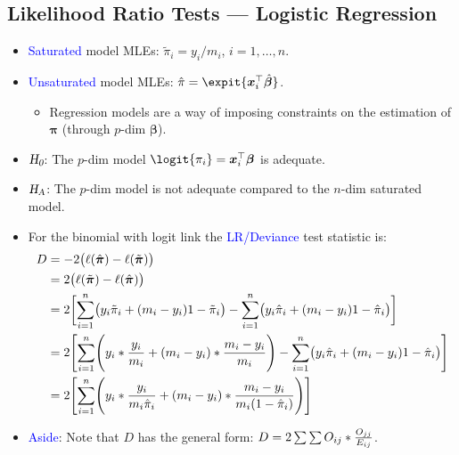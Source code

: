 \documentclass[oneside]{book}\usepackage[]{graphicx}\usepackage[svgnames]{xcolor}
\let\log\relax%
\newcommand{\HN}{\textsl{H}_{\textsl{0}}}%
\newcommand{\HA}{\textsl{H}_{\textsl{A}}}%
\providecommand{\Vector}[1]{\bm{#1}}%
\begin{document}
\subsection*{Likelihood Ratio Tests --- Logistic Regression}
\begin{itemize}
      \item \textcolor{Blue}{Saturated} model MLEs: $ \tilde{\pi}_i=y_i/m_i $, $ i=1,\ldots,n $.
      \item \textcolor{Blue}{Unsaturated} model MLEs: $ \hat{\pi}=\expit{\Vector{x}_i^\top \hat{\Vector{\beta}}} $.
            \begin{itemize}
                  \item Regression models are a way of imposing constraints on the estimation of $ \Vector{\pi} $ (through $ p $-dim $ \Vector{\beta} $).
            \end{itemize}
      \item $ \HN $: The $ p $-dim model $ \logit{\pi_i}=\Vector{x}_i^\top \Vector{\beta} $ is adequate.
      \item $ \HA $: The $ p $-dim model is not adequate compared to the $n$-dim saturated model.
      \item For the binomial with logit link the \textcolor{Blue}{LR/Deviance} test statistic is:
            \begin{align*}
                  D
                   & =-2\bigl(\ell(\hat{\Vector{\pi}})-\ell(\tilde{\Vector{\pi}})\bigr)                                                                                                                      \\
                   & =2\bigl(\ell(\tilde{\Vector{\pi}})-\ell(\hat{\Vector{\pi}})\bigr)                                                                                                                       \\
                   & =2\biggl[\sum_{i=1}^{n} \bigl(y_i\log{\tilde{\pi}_i}+(m_i-y_i)\log{1-\tilde{\pi}_i}\bigr)-\sum_{i=1}^{n} \bigl(y_i\log{\hat{\pi}_i}+(m_i-y_i)\log{1-\hat{\pi}_i}\bigr) \biggr]          \\
                   & =2\Biggl[\sum_{i=1}^{n} \Biggl(y_i\log*{\frac{y_i}{m_i}}+(m_i-y_i)\log*{\frac{m_i-y_i}{m_i}}\Biggr)-\sum_{i=1}^{n} \bigl(y_i\log{\hat{\pi}_i}+(m_i-y_i)\log{1-\hat{\pi}_i}\bigr)\Biggr] \\
                   & =2\Biggl[\sum_{i=1}^{n} \Biggl(y_i\log*{\frac{y_i}{m_i\hat{\pi}_i}}+(m_i-y_i)\log*{\frac{m_i-y_i}{m_i(1-\hat{\pi}_i)}}\Biggr)\Biggr]
            \end{align*}
      \item \textcolor{Blue}{Aside}: Note that $ D $ has the general form: $ D=2\sum\sum O_{ij}\log*{\frac{O_{jj}}{E_{ij}}} $.
\end{itemize}
\end{document}
